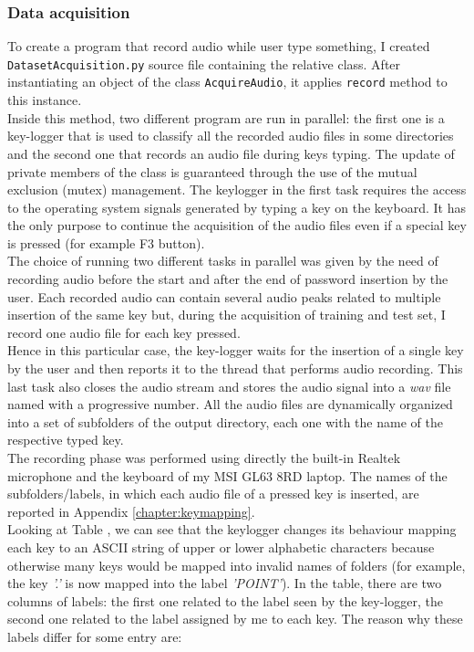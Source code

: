 \subsubsection{Data acquisition}
To create a program that record audio while user type something, I created \texttt{DatasetAcquisition.py} source file containing the relative class. After instantiating an object of the class \texttt{AcquireAudio}, it applies \texttt{record} method to this instance.\\
Inside this method, two different program are run in parallel: the first one is a key-logger that is used to classify all the recorded audio files in some directories and the second one that records an audio file during keys typing. The update of private members of the class is guaranteed through the use of the mutual exclusion (mutex) management. The keylogger in the first task requires the access to the operating system signals generated by typing a key on the keyboard. It has the only purpose to continue the acquisition of the audio files even if a special key is pressed (for example F3 button).\\
The choice of running two different tasks in parallel was given by the need of recording audio before the start and after the end of password insertion by the user. Each recorded audio can contain several audio peaks related to multiple insertion of the same key but, during the acquisition of training and test set, I record one audio file for each key pressed.\\
Hence in this particular case, the key-logger waits for the insertion of a single key by the user and then reports it to the thread that performs audio recording. This last task also closes the audio stream and stores the audio signal into a \textit{wav} file named with a progressive number. All the audio files are dynamically organized into a set of subfolders of the output directory, each one with the name of the respective typed key.\\
The recording phase was performed using directly the built-in Realtek microphone and the keyboard of my MSI GL63 8RD laptop. The names of the subfolders/labels, in which each audio file of a pressed key is inserted, are reported in Appendix \ref{chapter:keymapping}.\\
Looking at Table , we can see that the keylogger changes its behaviour mapping each key to an ASCII string of upper or lower alphabetic characters because otherwise many keys would be mapped into invalid names of folders (for example, the key \textit{'.'} is now mapped into the label \textit{'POINT'}). In the table, there are two columns of labels: the first one related to the label seen by the key-logger, the second one related to the label assigned by me to each key. The reason why these labels differ for some entry are:
